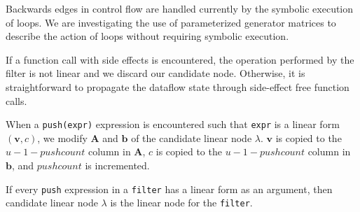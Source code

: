 Backwards edges in control flow are handled currently by the symbolic execution
of loops. We are investigating the use of parameterized generator matrices 
to describe the action of loops without requiring symbolic execution.

If a function call with side effects is encountered, the operation performed
by the filter is not linear and we discard our candidate node. Otherwise,
it is straightforward to propagate the dataflow state through side-effect free function calls. 

When a {\tt push(expr)} expression is encountered such that {\tt expr} is a linear form 
$({\mathbf v},c)$, we modify ${\mathbf A}$ and ${\mathbf b}$ of the candidate linear node $\lambda$.
${\mathbf v}$ is copied to the $u-1-pushcount$ column in ${\mathbf A}$,
$c$ is copied to the $u-1-pushcount$ column in ${\mathbf b}$, and $pushcount$ is incremented.

If every {\tt push} expression in a {\tt filter} has a linear form as
an argument, then candidate linear node $\lambda$ is the linear node
for the {\tt filter}.
